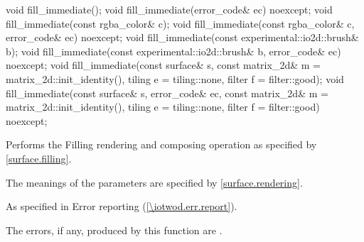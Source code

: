 \begin{itemdecl}
void fill_immediate();
void fill_immediate(error_code& ec) noexcept;
void fill_immediate(const rgba_color& c);
void fill_immediate(const rgba_color& c, error_code& ec) noexcept;
void fill_immediate(const experimental::io2d::brush& b);
void fill_immediate(const experimental::io2d::brush& b, error_code& ec)
  noexcept;
void fill_immediate(const surface& s, 
  const matrix_2d& m = matrix_2d::init_identity(),
  tiling e = tiling::none, filter f = filter::good);
void fill_immediate(const surface& s, error_code& ec, 
  const matrix_2d& m = matrix_2d::init_identity(),
  tiling e = tiling::none, filter f = filter::good) noexcept;
\end{itemdecl}
\begin{itemdescr}
\pnum
\effects
Performs the Filling rendering and composing operation as specified by \ref{surface.filling}.

\pnum
The meanings of the parameters are specified by \ref{surface.rendering}.

\pnum
\throws
As specified in Error reporting (\ref{\iotwod.err.report}).

\pnum
\errors
The errors, if any, produced by this function are .
\end{itemdescr}

